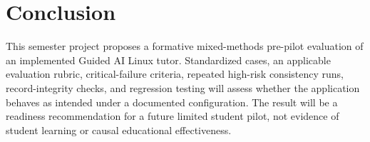 \documentclass[conference]{IEEEtran}
\begin{document}
\section{Conclusion}

This semester project proposes a formative mixed-methods pre-pilot
evaluation of an implemented Guided AI Linux tutor. Standardized cases,
an applicable evaluation rubric, critical-failure criteria, repeated
high-risk consistency runs, record-integrity checks, and regression
testing will assess whether the application behaves as intended under a
documented configuration. The result will be a readiness recommendation
for a future limited student pilot, not evidence of student learning or
causal educational effectiveness.



\end{document}
